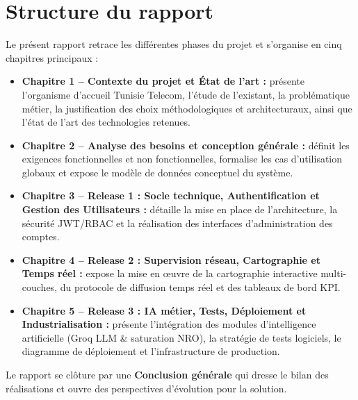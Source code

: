 \section*{Structure du rapport}
Le pr\'esent rapport retrace les diff\'erentes phases du projet et s'organise en cinq chapitres principaux :
\begin{itemize}
    \item \textbf{Chapitre 1 -- Contexte du projet et \'Etat de l'art :} pr\'esente l'organisme d'accueil Tunisie Telecom, l'\'etude de l'existant, la probl\'ematique m\'etier, la justification des choix m\'ethodologiques et architecturaux, ainsi que l'\'etat de l'art des technologies retenues.
    \item \textbf{Chapitre 2 -- Analyse des besoins et conception g\'en\'erale :} d\'efinit les exigences fonctionnelles et non fonctionnelles, formalise les cas d'utilisation globaux et expose le mod\`ele de donn\'ees conceptuel du syst\`eme.
    \item \textbf{Chapitre 3 -- Release 1 : Socle technique, Authentification et Gestion des Utilisateurs :} d\'etaille la mise en place de l'architecture, la s\'ecurit\'e JWT/RBAC et la r\'ealisation des interfaces d'administration des comptes.
    \item \textbf{Chapitre 4 -- Release 2 : Supervision r\'eseau, Cartographie et Temps r\'eel :} expose la mise en \oe uvre de la cartographie interactive multi-couches, du protocole de diffusion temps r\'eel et des tableaux de bord KPI.
    \item \textbf{Chapitre 5 -- Release 3 : IA m\'etier, Tests, D\'eploiement et Industrialisation :} pr\'esente l'int\'egration des modules d'intelligence artificielle (Groq LLM \& saturation NRO), la strat\'egie de tests logiciels, le diagramme de d\'eploiement et l'infrastructure de production.
\end{itemize}
Le rapport se cl\^oture par une \textbf{Conclusion g\'en\'erale} qui dresse le bilan des r\'ealisations et ouvre des perspectives d'\'evolution pour la solution.
